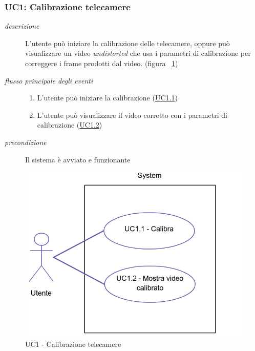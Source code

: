 \subsubsection{UC1: Calibrazione telecamere} \label{sec:UC1}
\begin{description}
\item[\em{descrizione }]L'utente può iniziare la calibrazione delle telecamere, oppure può visualizzare un video \textit{undistorted} che usa i parametri di calibrazione per correggere i frame prodotti dal video. (figura ~\ref{fig:uc1})
\item[\em{flusso principale degli eventi }] \mbox{}
 \begin{enumerate}
\item L'utente può iniziare la calibrazione (\hyperref[sec:uc1.1]{UC1.1}) 
\item L'utente può visualizzare il video corretto con i parametri di calibrazione (\hyperref[sec:uc1.2]{UC1.2})
\end{enumerate}
\item[\em{precondizione }] Il sistema è avviato e funzionante
\end{description}

\begin{figure}[htpb] 

\centering 

\includegraphics[scale=0.4]{./images/uc1.png} 

\caption{UC1 - Calibrazione telecamere} 

\label{fig:uc1}

\end{figure} 

